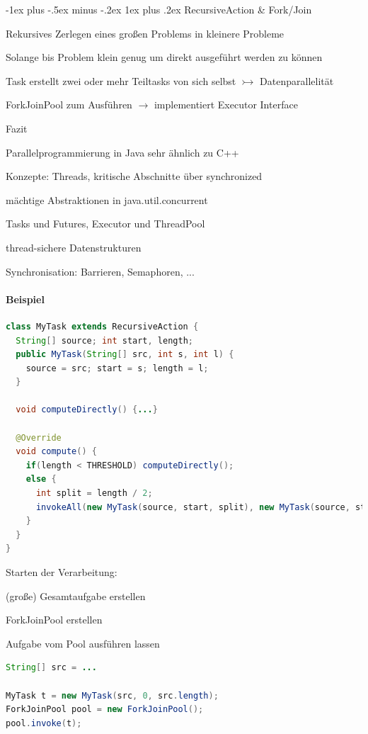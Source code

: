 \documentclass[10pt]{article}
\makeatletter
\renewcommand{\subsubsection}{\@startsection{subsubsection}{3}{0mm}%
                                {-1ex plus -.5ex minus -.2ex}%
                                {1ex plus .2ex}%
                                {\normalfont\small\bfseries}}
\makeatother
\begin{document}
\subsubsection{RecursiveAction \& Fork/Join}
\begin{itemize*}
  \item Rekursives Zerlegen eines großen Problems in kleinere Probleme
  \item Solange bis Problem klein genug um direkt ausgeführt werden zu können
  \item Task erstellt zwei oder mehr Teiltasks von sich selbst $\rightarrowtail$ Datenparallelität
  \item ForkJoinPool zum Ausführen $\rightarrow$ implementiert Executor Interface
  \item Fazit
  \begin{itemize*}
    \item Parallelprogrammierung in Java sehr ähnlich zu C++
    \item Konzepte: Threads, kritische Abschnitte über synchronized
    \item mächtige Abstraktionen in java.util.concurrent
    \begin{itemize*}
      \item Tasks und Futures, Executor und ThreadPool
      \item thread-sichere Datenstrukturen
      \item Synchronisation: Barrieren, Semaphoren, ...
    \end{itemize*}
  \end{itemize*}
\end{itemize*}

\paragraph{Beispiel}
\begin{lstlisting}[language=java]
class MyTask extends RecursiveAction {
  String[] source; int start, length;
  public MyTask(String[] src, int s, int l) {
    source = src; start = s; length = l;
  }

  void computeDirectly() {...}

  @Override
  void compute() {
    if(length < THRESHOLD) computeDirectly();
    else {
      int split = length / 2;
      invokeAll(new MyTask(source, start, split), new MyTask(source, start+split, length-split))
    }
  }
}
\end{lstlisting}

Starten der Verarbeitung: 
\begin{enumerate*}
  \item (große) Gesamtaufgabe erstellen
  \item ForkJoinPool erstellen
  \item Aufgabe vom Pool ausführen lassen
\end{enumerate*}
\begin{lstlisting}[language=java]
String[] src = ...

MyTask t = new MyTask(src, 0, src.length);
ForkJoinPool pool = new ForkJoinPool();
pool.invoke(t);
\end{lstlisting}
\end{document}
